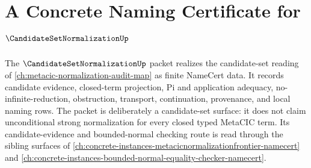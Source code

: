 \chapter{A Concrete Naming Certificate for $\CandidateSetNormalizationUp$}
\label{ch:concrete-instances-metacic-candidate-set-normalization-namecert}

The $\CandidateSetNormalizationUp$ packet realizes the candidate-set reading of \autoref{ch:metacic-normalization-audit-map} as finite NameCert data. It records candidate evidence, closed-term projection, Pi and application adequacy, no-infinite-reduction, obstruction, transport, continuation, provenance, and local naming rows. The packet is deliberately a candidate-set surface: it does not claim unconditional strong normalization for every closed typed MetaCIC term. Its candidate-evidence and bounded-normal checking route is read through the sibling surfaces of \autoref{ch:concrete-instances-metacicnormalizationfrontier-namecert} and \autoref{ch:concrete-instances-bounded-normal-equality-checker-namecert}.


